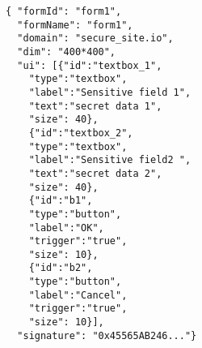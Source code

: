 
\begin{figure}[t]
\begin{lstlisting}[mathescape=true]
{ "formId": "form1",
  "formName": "form1",
  "domain": "secure_site.io",
  "dim": "400*400",
  "ui": [{"id":"textbox_1",
  	"type":"textbox",
	"label":"Sensitive field 1",
	"text":"secret data 1",
	"size": 40},
	{"id":"textbox_2",
	"type":"textbox",
	"label":"Sensitive field2 ",
	"text":"secret data 2",
	"size": 40},
	{"id":"b1",
	"type":"button",
	"label":"OK",
	"trigger":"true",
	"size": 10},	
	{"id":"b2",
	"type":"button",
	"label":"Cancel",
	"trigger":"true",
	"size": 10}],
  "signature": "0x45565AB246..."}
\end{lstlisting}
\end{figure}

% 


